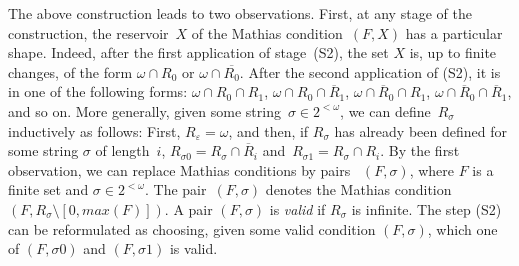 The above construction leads to two observations.
First, at any stage of the construction, the reservoir~$X$ of the Mathias condition~$(F, X)$
has a particular shape. Indeed, after the first application of stage~(S2), 
the set $X$ is, up to finite changes, of the form $\omega \cap R_0$
or $\omega \cap \overline{R_0}$. After the second application of (S2), it is in one of the following forms: $\omega \cap R_0 \cap R_1$,
$\omega \cap R_0 \cap \overline{R}_1$, $\omega \cap \overline{R}_0 \cap R_1$,
$\omega \cap \overline{R}_0 \cap \overline{R}_1$, and so on. More generally, given some string~$\sigma \in 2^{<\omega}$,
we can define~$R_\sigma$ inductively as follows:
First, $R_\varepsilon = \omega$, and then, if $R_\sigma$ has already been defined for some string $\sigma$ of length~$i$,
$R_{\sigma 0} = R_\sigma \cap \overline{R}_i$ and~$R_{\sigma 1} = R_\sigma \cap R_i$.
By the first observation, we can replace Mathias conditions by pairs ~$(F, \sigma)$, where $F$ is a finite set
and $\sigma \in 2^{<\omega}$. The pair~$(F, \sigma)$ denotes the Mathias condition~$(F, R_\sigma \setminus [0, max(F)])$.
A pair $(F, \sigma)$ is \emph{valid} if $R_\sigma$ is infinite.
The step (S2) can be reformulated as choosing, given some valid condition $(F, \sigma)$, which one of $(F, \sigma 0)$
and $(F, \sigma 1)$ is valid.




